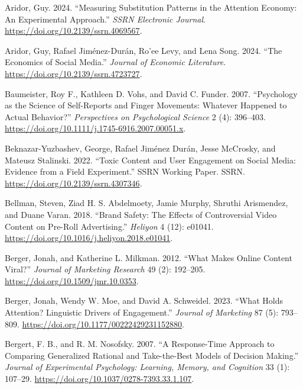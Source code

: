 \documentclass[
  a4paper,
]{scrreprt}
\newlength{\cslhangindent}
\newlength{\cslentryspacingunit} %
\newenvironment{CSLReferences}[2] %
 {%
  \setlength{\parindent}{0pt}
  \ifodd #1
  \let\oldpar\par
  \def\par{\hangindent=\cslhangindent\oldpar}
  \fi
  \setlength{\parskip}{#2\cslentryspacingunit}
 }%
 {}
\begin{document}
\begin{CSLReferences}{1}{0}
\leavevmode{}%
Aridor, Guy. 2024. {``Measuring Substitution Patterns in the Attention
Economy: An Experimental Approach.''} \emph{SSRN Electronic Journal}.
\url{https://doi.org/10.2139/ssrn.4069567}.

\leavevmode{}%
Aridor, Guy, Rafael Jiménez-Durán, Ro'ee Levy, and Lena Song. 2024.
{``The Economics of Social Media.''} \emph{Journal of Economic
Literature}. \url{https://doi.org/10.2139/ssrn.4723727}.

\leavevmode{}%
Baumeister, Roy F., Kathleen D. Vohs, and David C. Funder. 2007.
{``Psychology as the Science of Self-Reports and Finger Movements:
Whatever Happened to Actual Behavior?''} \emph{Perspectives on
Psychological Science} 2 (4): 396--403.
\url{https://doi.org/10.1111/j.1745-6916.2007.00051.x}.

\leavevmode{}%
Beknazar-Yuzbashev, George, Rafael Jiménez Durán, Jesse McCrosky, and
Mateusz Stalinski. 2022. {``Toxic Content and User Engagement on Social
Media: Evidence from a Field Experiment.''} SSRN Working Paper. SSRN.
\url{https://doi.org/10.2139/ssrn.4307346}.

\leavevmode{}%
Bellman, Steven, Ziad H. S. Abdelmoety, Jamie Murphy, Shruthi
Arismendez, and Duane Varan. 2018. {``Brand Safety: The Effects of
Controversial Video Content on Pre-Roll Advertising.''} \emph{Heliyon} 4
(12): e01041. \url{https://doi.org/10.1016/j.heliyon.2018.e01041}.

\leavevmode{}%
Berger, Jonah, and Katherine L. Milkman. 2012. {``What Makes Online
Content Viral?''} \emph{Journal of Marketing Research} 49 (2): 192--205.
\url{https://doi.org/10.1509/jmr.10.0353}.

\leavevmode{}%
Berger, Jonah, Wendy W. Moe, and David A. Schweidel. 2023. {``What Holds
Attention? Linguistic Drivers of Engagement.''} \emph{Journal of
Marketing} 87 (5): 793--809.
\url{https://doi.org/10.1177/00222429231152880}.

\leavevmode{}%
Bergert, F. B., and R. M. Nosofsky. 2007. {``A Response-Time Approach to
Comparing Generalized Rational and Take-the-Best Models of Decision
Making.''} \emph{Journal of Experimental Psychology: Learning, Memory,
and Cognition} 33 (1): 107--29.
\url{https://doi.org/10.1037/0278-7393.33.1.107}.


\end{CSLReferences}
\end{document}
